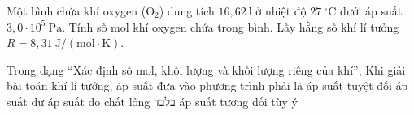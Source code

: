 \begin{ex}
Một bình chứa khí oxygen ($\mathrm{O_2}$) dung tích $16,62\ \mathrm{l}$ ở nhiệt độ $27\ ^\circ\mathrm{C}$ dưới áp suất $3,0 \cdot 10^5\ \mathrm{Pa}$. Tính số mol khí oxygen chứa trong bình. Lấy hằng số khí lí tưởng $R = 8,31\ \mathrm{J/(mol\cdot K)}$.
\end{ex}

\begin{ex}
Trong dạng “Xác định số mol, khối lượng và khối lượng riêng của khí”, Khi giải bài toán khí lí tưởng, áp suất đưa vào phương trình phải là
\choice
{\True áp suất tuyệt đối}
{áp suất dư}
{áp suất do chất lỏng בלבד}
{áp suất tương đối tùy ý}
\end{ex}

